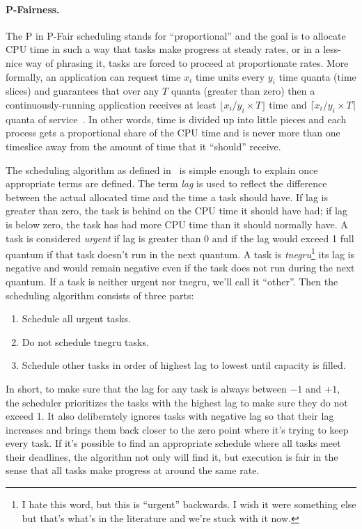 \paragraph{P-Fairness.}
The P in P-Fair scheduling stands for ``proportional'' and the goal is to allocate CPU time in such a way that tasks make progress at steady rates, or in a less-nice way of phrasing it, tasks are forced to proceed at proportionate rates. More formally, an application can request time $x_i$ time units every $y_i$ time quanta (time slices) and guarantees that over any $T$ quanta (greater than zero) then a continuously-running application receives at least $\lfloor x_i/y_i \times T\rfloor$ time and $\lceil x_i/y_i \times T\rceil$ quanta of service~\cite{pfair2}. In other words, time is divided up into little pieces and each process gets a proportional share of the CPU time and is never more than one timeslice away from the amount of time that it ``should'' receive.

The scheduling algorithm as defined in~\cite{pfair} is simple enough to explain once appropriate terms are defined. The term \textit{lag} is used to reflect the difference between the actual allocated time and the time a task should have. If lag is greater than zero, the task is behind on the CPU time it should have had; if lag is below zero, the task has had more CPU time than it should normally have.  A task is considered \textit{urgent} if lag is greater than 0 and if the lag would exceed 1 full quantum if that task doesn't run in the next quantum. A task is \textit{tnegru}\footnote{I hate this word, but this is ``urgent'' backwards. I wish it were something else but that's what's in the literature and we're stuck with it now.} its lag is negative and would remain negative even if the task does not run during the next quantum. If a task is neither urgent nor tnegru, we'll call it ``other''. Then the scheduling algorithm consists of three parts:
\begin{enumerate}
	\item Schedule all urgent tasks.
	\item Do not schedule tnegru tasks.
	\item Schedule other tasks in order of highest lag to lowest until capacity is filled.
\end{enumerate}

In short, to make sure that the lag for any task is always between $-1$ and $+1$, the scheduler prioritizes the tasks with the highest lag to make sure they do not exceed 1. It also deliberately ignores tasks with negative lag so that their lag increases and brings them back closer to the zero point where it's trying to keep every task. If it's possible to find an appropriate schedule where all tasks meet their deadlines, the algorithm not only will find it, but execution is fair in the sense that all tasks make progress at around the same rate.

